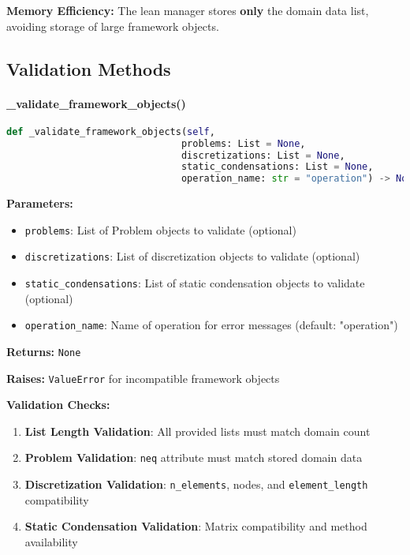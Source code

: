 \textbf{Memory Efficiency:} The lean manager stores \textbf{only} the domain data list, avoiding storage of large framework objects.

\subsection{Validation Methods}
\label{subsec:validation_methods}

\paragraph{\_validate\_framework\_objects()}\leavevmode
\begin{lstlisting}[language=Python, caption=Framework Validation Method]
def _validate_framework_objects(self, 
                               problems: List = None,
                               discretizations: List = None, 
                               static_condensations: List = None,
                               operation_name: str = "operation") -> None
\end{lstlisting}

\textbf{Parameters:}
\begin{itemize}
    \item \texttt{problems}: List of Problem objects to validate (optional)
    \item \texttt{discretizations}: List of discretization objects to validate (optional)
    \item \texttt{static\_condensations}: List of static condensation objects to validate (optional)
    \item \texttt{operation\_name}: Name of operation for error messages (default: "operation")
\end{itemize}

\textbf{Returns:} \texttt{None}

\textbf{Raises:} \texttt{ValueError} for incompatible framework objects

\textbf{Validation Checks:}
\begin{enumerate}
    \item \textbf{List Length Validation}: All provided lists must match domain count
    \item \textbf{Problem Validation}: \texttt{neq} attribute must match stored domain data
    \item \textbf{Discretization Validation}: \texttt{n\_elements}, nodes, and \texttt{element\_length} compatibility
    \item \textbf{Static Condensation Validation}: Matrix compatibility and method availability
\end{enumerate}


